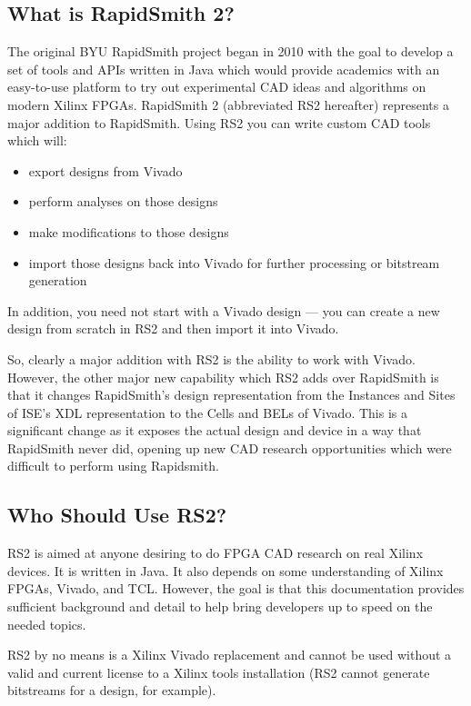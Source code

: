 \documentclass[12pt]{article}
\begin{document}
\subsection{What is RapidSmith 2?}
The original BYU RapidSmith project began in 2010 with the goal to develop
a set of tools and APIs written in Java which would provide academics with an
easy-to-use platform to try out experimental CAD ideas and algorithms on modern
Xilinx FPGAs.  RapidSmith 2 (abbreviated RS2 hereafter) represents a major
addition to RapidSmith.  Using RS2 you can write custom CAD tools which will:
\begin{itemize}
  \item export designs from Vivado
  \item perform analyses on those designs
  \item make modifications to those designs
  \item import those designs back into Vivado for further processing or bitstream generation
\end{itemize}
In addition, you need not start with a Vivado design --- 
you can create a new
design from scratch in RS2 and then
import it into Vivado.

So, clearly a major addition with RS2 is the ability to work with Vivado. 
However, the other major new capability which RS2 adds over RapidSmith is that
it changes RapidSmith's design representation from the Instances and Sites of
ISE's XDL representation to the Cells and BELs of Vivado.   This is a
significant change as it exposes the actual design and device in a way that RapidSmith never
did, opening up new CAD research opportunities which were difficult
to perform using Rapidsmith.
       
\subsection{Who Should Use RS2?}
RS2 is aimed at anyone desiring to do FPGA CAD research on real Xilinx devices. 
It is written in Java. It also depends on some understanding of Xilinx FPGAs,
Vivado, and TCL.  However, the goal is that this documentation provides
sufficient background and detail to help bring developers up to speed on the
needed topics.    

RS2 by no means is a Xilinx Vivado replacement and cannot be used without a
valid and current license to a Xilinx tools installation (RS2 cannot generate
bitstreams for a design, for example).     
\end{document}
